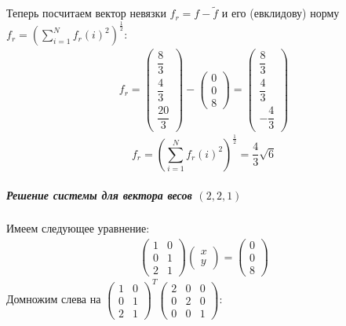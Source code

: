 \documentclass[11pt,a4paper]{report}
\begin{document}
Теперь посчитаем вектор невязки $f_r = f - \tilde{f}$ и его (евклидову) норму $f_r = (\sum_{i=1}^{N} f_r(i)^2)^{\frac{1}{2}}$:
\begin{gather*}
	f_r =  \begin{pmatrix} \dfrac{8}{3}\\[2ex]\dfrac{4}{3}\\[2ex]\dfrac{20}{3} \end{pmatrix} - \begin{pmatrix} 0\\0\\8 \end{pmatrix} = \begin{pmatrix} \dfrac{8}{3}\\[2ex]\dfrac{4}{3}\\[2ex]-\dfrac{4}{3} \end{pmatrix}
\end{gather*}
\[
f_r = (\sum_{i=1}^{N} f_r(i)^2)^{\frac{1}{2}} = \frac{4}{3}\sqrt6
\]
\subparagraph{Решение системы для вектора весов $(2,2,1)$}  %
Имеем следующее уравнение:
\begin{gather*}
\begin{pmatrix} 1&0\\0&1\\2&1 \end{pmatrix}\begin{pmatrix} x\\y \end{pmatrix}=\begin{pmatrix} 0\\0\\8 \end{pmatrix}
\end{gather*}
Домножим слева на $\begin{pmatrix} 1&0\\0&1\\2&1 \end{pmatrix}^T\begin{pmatrix} 2&0&0\\0&2&0\\0&0&1 \end{pmatrix}$:
\end{document}

